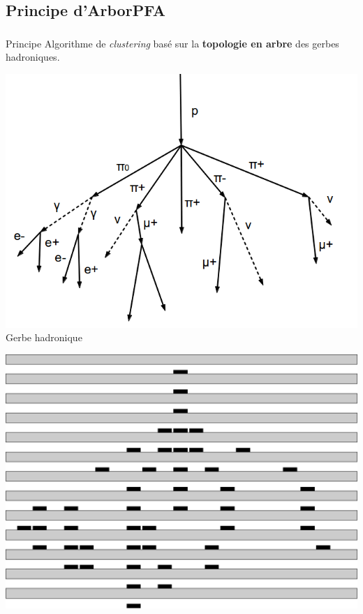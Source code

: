 \documentclass[8pt]{beamer}
\begin{document}
  \subsection{Principe d'ArborPFA}
  \begin{frame}
  \frametitle{\secname}
  \framesubtitle{\subsecname}
  \begin{block}{Principe}
    Algorithme de \textit{clustering} basé sur la \textbf{topologie en arbre} des gerbes hadroniques.
  \end{block}
  \pause
  \begin{minipage}{0.325\linewidth}
    \begin{center}
      \includegraphics[width=\linewidth]{ProtonDecay.png} \\
      Gerbe hadronique
    \end{center}
  \end{minipage} \hfill
  \begin{minipage}{0.325\linewidth}
    \begin{center}
      \pause
      \includegraphics[width=\linewidth]{ProtonDecayCaloNoConnector.pdf} \\

\end{center}
\end{minipage}
\end{frame}
\end{document}
